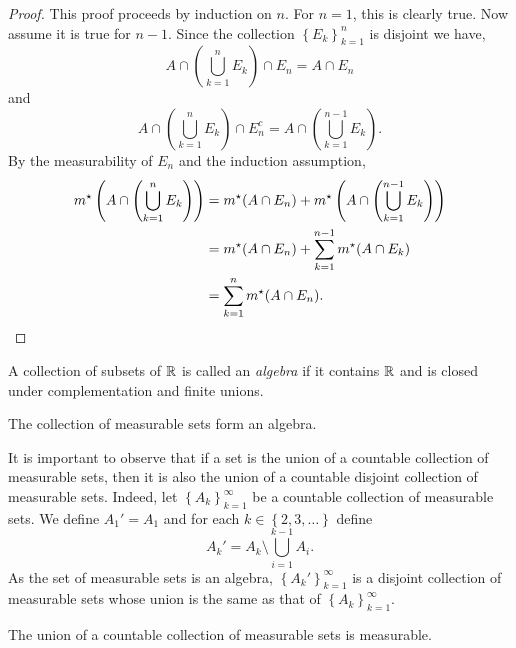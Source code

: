 \begin{proof}
	This proof proceeds by induction on $n$.
	For $n = 1$, this is clearly true.
	Now assume it is true for $n - 1$.
	Since the collection $\left\{
		E_k
	\right\}_{k=1}^n$ is disjoint we have, \[
		A \cap \left( 
			\bigcup_{k=1}^n E_k 
		\right) \cap E_n = A \cap E_n
	\]
	and \[
		A \cap \left( 
			\bigcup_{k=1}^n E_k 
		\right) \cap E^c_n = A \cap \left( 
			\bigcup_{k=1}^{n-1} E_k 
		\right).
	\]
	By the measurability of $E_n$ and the induction assumption,
	\begin{align*}
		m^\star\left( 
			A \cap \left( 
				\bigcup_{k=1}^n E_k
			\right) 
		\right)
		&= m^\star(A \cap E_n) + m^\star\left( 
			A \cap \left( 
				\bigcup_{k=1}^{n-1} E_k 
			\right) 
		\right) \\
		&= m^\star(A \cap E_n) +
			\sum^{n-1}_{k=1} m^\star(A \cap E_k) \\
		&= \sum_{k=1}^n m^\star(A \cap E_n). \qedhere
	\end{align*}
\end{proof}

\begin{definition}[Algebra]
	A collection of subsets of $\mathbb{R}$ is called an \emph{algebra} if it contains
	$\mathbb{R}$ and is closed under complementation and finite unions.
\end{definition}

\begin{proposition}[]
	The collection of measurable sets form an algebra.
\end{proposition}

It is important to observe that if a set is the union of a countable collection
of measurable sets, then it is also the union of a countable disjoint collection
of measurable sets.
Indeed, let $
	\left\{
		A_k
	\right\}_{k=1}^\infty
$ be a countable collection of measurable sets.
We define $A_1' = A_1$ and for each $k \in \left\{
	2, 3, \ldots
\right\}$ define \[
	A_k' = A_k \setminus \bigcup_{i=1}^{k-1} A_i.
\]
As the set of measurable sets is an algebra, $
	\left\{
		A_k'
	\right\}_{k=1}^\infty
$ is a disjoint collection of measurable sets whose union is the same as that of
$
	\left\{
		A_k
	\right\}_{k=1}^\infty
$.

\begin{proposition}[]
	The union of a countable collection of measurable sets is measurable.
\end{proposition}

